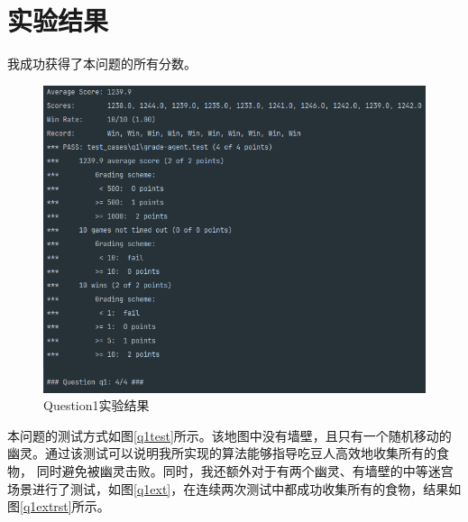 \section{实验结果}
%
%
我成功获得了本问题的所有分数。
\begin{figure}[htbp]
    \centering
    \includegraphics[scale = 0.7]{pic/q1.png}
    \caption{Question1实验结果}\label{q1}
\end{figure}

本问题的测试方式如图\ref{q1test}所示。该地图中没有墙壁，且只有一个随机移动的幽灵。通过该测试可以说明我所实现的算法能够指导吃豆人高效地收集所有的食物，
同时避免被幽灵击败。同时，我还额外对于有两个幽灵、有墙壁的中等迷宫场景进行了测试，如图\ref{q1ext}，在连续两次测试中都成功收集所有的食物，结果如图\ref{q1extrst}所示。

